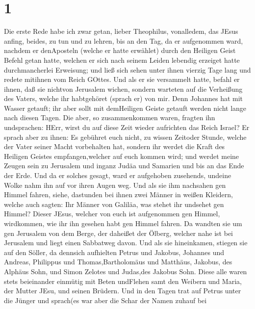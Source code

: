 \hypertarget{section}{%
\section{1}\label{section}}

 Die erste Rede habe ich zwar getan, lieber Theophilus,
vonalledem, das JEsus anfing, beides, zu tun und zu lehren, 
bis an den Tag, da er aufgenommen ward, nachdem er denAposteln (welche
er hatte erwählet) durch den Heiligen Geist Befehl getan hatte,
 welchen er sich nach seinem Leiden lebendig erzeiget hatte
durchmancherlei Erweisung; und ließ sich sehen unter ihnen vierzig Tage
lang und redete mitihnen vom Reich GOttes.  Und als er sie
versammelt hatte, befahl er ihnen, daß sie nichtvon Jerusalem wichen,
sondern warteten auf die Verheißung des Vaters, welche ihr habtgehöret
(sprach er) von mir.  Denn Johannes hat mit Wasser getauft;
ihr aber sollt mit demHeiligen Geiste getauft werden nicht lange nach
diesen Tagen.  Die aber, so zusammenkommen waren, fragten
ihn undsprachen: HErr, wirst du auf diese Zeit wieder aufrichten das
Reich Israel?  Er sprach aber zu ihnen: Es gebühret euch
nicht, zu wissen Zeitoder Stunde, welche der Vater seiner Macht
vorbehalten hat,  sondern ihr werdet die Kraft des Heiligen
Geistes empfangen,welcher auf euch kommen wird; und werdet meine Zeugen
sein zu Jerusalem und inganz Judäa und Samarien und bis an das Ende der
Erde.  Und da er solches gesagt, ward er aufgehoben
zusehends, undeine Wolke nahm ihn auf vor ihren Augen weg. 
Und als sie ihm nachsahen gen Himmel fahren, siehe, dastunden bei ihnen
zwei Männer in weißen Kleidern,  welche auch sagten: Ihr
Männer von Galiläa, was stehet ihr undsehet gen Himmel? Dieser JEsus,
welcher von euch ist aufgenommen gen Himmel, wirdkommen, wie ihr ihn
gesehen habt gen Himmel fahren.  Da wandten sie um gen
Jerusalem von dem Berge, der daheißet der Ölberg, welcher nahe ist bei
Jerusalem und liegt einen Sabbatweg davon.  Und als sie
hineinkamen, stiegen sie auf den Söller, da dennsich aufhielten Petrus
und Jakobus, Johannes und Andreas, Philippus und Thomas,Bartholomäus und
Matthäus, Jakobus, des Alphäus Sohn, und Simon Zelotes und Judas,des
Jakobus Sohn.  Diese alle waren stets beieinander einmütig
mit Beten undFlehen samt den Weibern und Maria, der Mutter JEsu, und
seinen Brüdern.  Und in den Tagen trat auf Petrus unter die
Jünger und sprach(es war aber die Schar der Namen zuhauf bei
